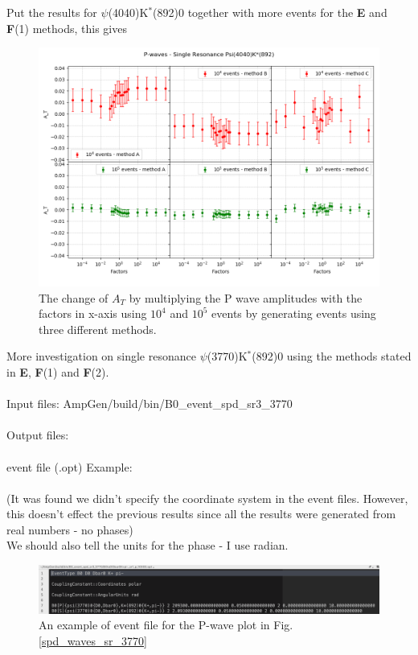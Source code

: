 \clearpage
Put the results for $\psi$(4040)K$^*$(892)0 together with more events for the \textbf{E} and \textbf{F}(1) methods, this gives
\begin{figure}[h]
\center
\includegraphics*[width=0.96\linewidth]{p_wave/spd_waves_sr_4040}
\caption{The change of $A_T$ by multiplying the P wave amplitudes with the factors in x-axis using $10^4$ and $10^5$ events by generating events using three different methods. }
\label{spd_waves_sr_4040}
\end{figure}
\clearpage
\noindent More investigation on single resonance $\psi$(3770)K$^*$(892)0 using the methods stated in \textbf{E}, \textbf{F}(1) and \textbf{F}(2).
\\
\\
\indent Input files: AmpGen/build/bin/B0\_event\_spd\_sr3\_3770
\\
\\
\indent Output files: 
\\
\\
event file (.opt) Example:
\\
\\
(It was found we didn't specify the coordinate system in the event files. However, this doesn't effect the previous results since all the results were generated from real numbers - no phases)
\\
We should also tell the units for the phase -  I use radian.
\\
\begin{figure}[h]
\center
\includegraphics*[width=0.96\linewidth]{p_wave/event_info_sr_3770}
\caption{An example of event file for the P-wave plot in Fig.\ref{spd_waves_sr_3770}}
\label{event_info_sr_3770}
\end{figure}
